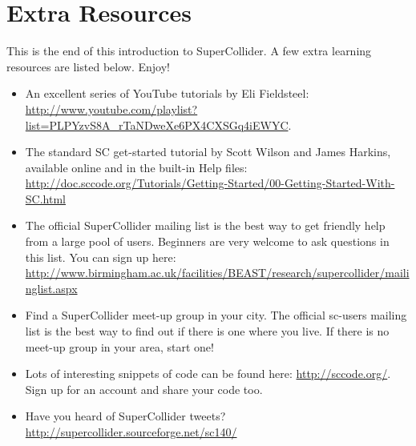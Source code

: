 \section{Extra Resources}

This is the end of this introduction to SuperCollider. A few extra learning resources are listed below. Enjoy!

\begin{itemize}
\item An excellent series of YouTube tutorials by Eli Fieldsteel: \url{http://www.youtube.com/playlist?list=PLPYzvS8A_rTaNDweXe6PX4CXSGq4iEWYC}. 

\item The standard SC get-started tutorial by Scott Wilson and James Harkins, available online and in the built-in Help files: \url{http://doc.sccode.org/Tutorials/Getting-Started/00-Getting-Started-With-SC.html}

\item The official SuperCollider mailing list is the best way to get friendly help from a large pool of users. Beginners are very welcome to ask questions in this list. You can sign up here: \url{http://www.birmingham.ac.uk/facilities/BEAST/research/supercollider/mailinglist.aspx}

\item Find a SuperCollider meet-up group in your city. The official sc-users mailing list is the best way to find out if there is one where you live. If there is no meet-up group in your area, start one!

\item Lots of interesting snippets of code can be found here: \url{http://sccode.org/}. Sign up for an account and share your code too.

\item Have you heard of SuperCollider tweets? \url{http://supercollider.sourceforge.net/sc140/}

\end{itemize}
